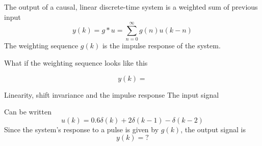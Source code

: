 \documentclass[presentation,aspectratio=1610]{beamer}
\begin{document}
\begin{frame}[label={sec:org95ac3ec}]{The output of a causal, linear discrete-time system is a weighted sum of previous input}
\[ y(k) = g \ast u = \sum_{n=0}^\infty g(n) u(k-n) \]
The \alert{weighting sequence} \(g(k)\) is the \alert{impulse response} of the system.

What if the weighting sequence looks like this

\begin{center}
\end{center}

\[y(k) = \]
\end{frame}

\begin{frame}[label={sec:org712e0e5}]{Linearity, shift invariance and the impulse response}
The input signal

\begin{center}
\end{center}

Can be written 
\[u(k) = 0.6\delta(k) + 2\delta(k-1) - \delta(k-2) \]
Since the system's response to a pulse is given by \(g(k)\), the output signal is
\[ y(k) = ?\]
\end{frame}
\end{document}

